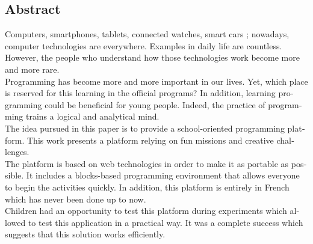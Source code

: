 \newpage
\begin{otherlanguage}{english}
\section*{Abstract}
Computers, smartphones, tablets, connected watches, smart cars ; nowadays, computer technologies are everywhere. Examples in daily life are countless. However, the people who understand how those technologies work become more and more rare. \\

Programming has become more and more important in our lives. Yet, which place is reserved for this learning in the official programs? In addition, learning programming could be beneficial for young people. Indeed, the practice of programming trains a logical and analytical mind. \\

The idea pursued in this paper is to provide a school-oriented programming platform. This work presents a platform relying on fun missions and creative challenges. \\

The platform is based on web technologies in order to make it as portable as possible. It includes a blocks-based programming environment that allows everyone to begin the activities quickly. In addition, this platform is entirely in French which has never been done up to now. \\

Children had an opportunity to test this platform during experiments which allowed to test this application in a practical way. It was a complete success which suggests that this solution works efficiently.
\end{otherlanguage}
